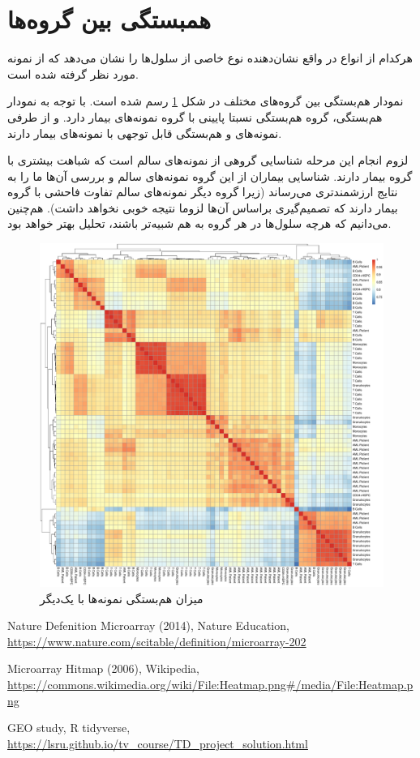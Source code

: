 \documentclass{article}
\begin{document}
\section{همبستگی بین گروه‌ها}
هرکدام از انواع  در واقع نشان‌دهنده نوع خاصی از سلول‌ها را نشان می‌دهد که از نمونه مورد نظر گرفته شده است.

نمودار هم‌بستگی بین گروه‌های مختلف در شکل \ref{fig:sourcename-cor-heatmap} رسم شده است.
با توجه به نمودار هم‌بستگی، گروه  هم‌بستگی نسبتا پایینی با گروه نمونه‌های بیمار دارد. 
و از طرفی نمونه‌های  و  هم‌بستگی قابل توجهی با نمونه‌های بیمار دارند.

لزوم انجام این مرحله شناسایی گروهی از نمونه‌های سالم است که شباهت بیشتری با گروه بیمار دارند.
شناسایی بیماران از این گروه نمونه‌های سالم و بررسی آن‌ها ما را به نتایج ارزشمندتری می‌رساند (زیرا گروه دیگر نمونه‌های سالم تفاوت فاحشی با گروه بیمار دارند که تصمیم‌گیری براساس آن‌ها لزوما نتیجه خوبی نخواهد داشت).
هم‌چنین می‌دانیم که هر‌چه سلول‌ها در هر گروه به هم شبیه‌تر باشند، تحلیل بهتر خواهد بود.

\begin{figure}[h!]
	\centering
	\includegraphics[width=0.8\columnwidth]{figs/SourceName-Cor-Heatmap.pdf}
	\caption{میزان هم‌بستگی نمونه‌ها با یک‌دیگر}
	\label{fig:sourcename-cor-heatmap}
\end{figure}


\clearpage

\begin{thebibliography}{99}
	\begin{latin}
		Nature Defenition Microarray (2014), Nature Education, \url{https://www.nature.com/scitable/definition/microarray-202}
		
		Microarray Hitmap (2006), Wikipedia, \url{https://commons.wikimedia.org/wiki/File:Heatmap.png#/media/File:Heatmap.png}
		
		GEO study, R tidyverse, \url{https://lsru.github.io/tv_course/TD_project_solution.html}
		
	\end{latin}
\end{thebibliography}
\end{document}
